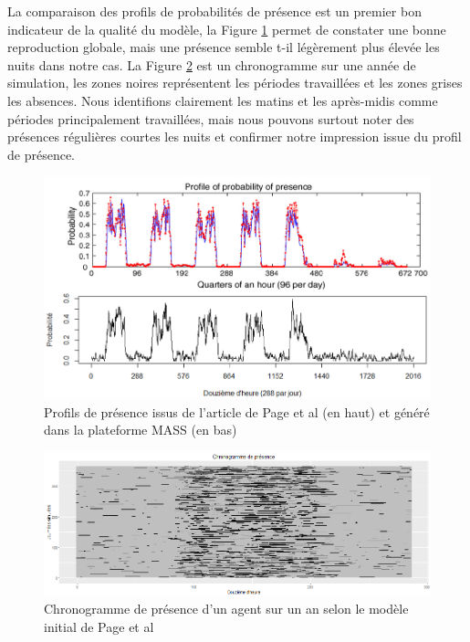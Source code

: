 La comparaison des profils de probabilités de présence est un premier bon indicateur de la qualité du modèle, la Figure \ref{fig:ProfilPresence} permet de constater une bonne reproduction globale, mais une présence semble t-il légèrement plus élevée les nuits dans notre cas. La Figure \ref{fig:ChronogrammeBase} est un chronogramme sur une année de simulation, les zones noires représentent les périodes travaillées et les zones grises les absences. Nous identifions clairement les matins et les après-midis comme périodes principalement travaillées, mais nous pouvons surtout noter des présences régulières courtes les nuits et confirmer notre impression issue du profil de présence.

\begin{figure}[H]
\centering
\includegraphics[scale=0.6]{Images/PageActivities/ProfilPresence}
\caption{Profils de présence issus de l'article de Page et al \cite{Page-08} (en haut) et généré dans la plateforme MASS (en bas)}
\label{fig:ProfilPresence}
\end{figure}

\begin{figure}[H]
\centering
\includegraphics[scale=0.46]{Images/PageActivities/ChronogrammeBase}
\caption{Chronogramme de présence d'un agent sur un an selon le modèle initial de Page et al \cite{Page-08}}
\label{fig:ChronogrammeBase}
\end{figure}

